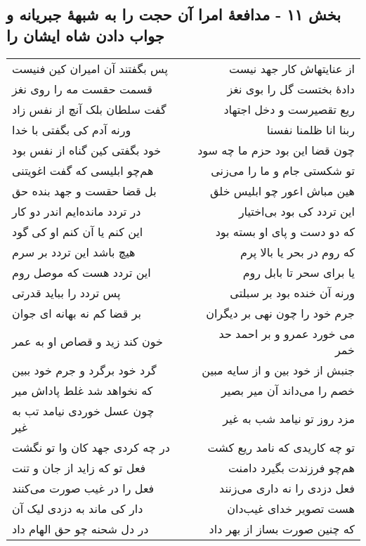 \begin{center}
\section*{بخش ۱۱ - مدافعهٔ امرا آن حجت را به شبههٔ جبریانه و جواب دادن شاه ایشان را}
\label{sec:sh011}
\begin{longtable}{l p{0.5cm} r}
پس بگفتند آن امیران کین فنیست
&&
از عنایتهاش کار جهد نیست
\\
قسمت حقست مه را روی نغز
&&
دادهٔ بختست گل را بوی نغز
\\
گفت سلطان بلک آنچ از نفس زاد
&&
ریع تقصیرست و دخل اجتهاد
\\
ورنه آدم کی بگفتی با خدا
&&
ربنا انا ظلمنا نفسنا
\\
خود بگفتی کین گناه از نفس بود
&&
چون قضا این بود حزم ما چه سود
\\
هم‌چو ابلیسی که گفت اغویتنی
&&
تو شکستی جام و ما را می‌زنی
\\
بل قضا حقست و جهد بنده حق
&&
هین مباش اعور چو ابلیس خلق
\\
در تردد مانده‌ایم اندر دو کار
&&
این تردد کی بود بی‌اختیار
\\
این کنم یا آن کنم او کی گود
&&
که دو دست و پای او بسته بود
\\
هیچ باشد این تردد بر سرم
&&
که روم در بحر یا بالا پرم
\\
این تردد هست که موصل روم
&&
یا برای سحر تا بابل روم
\\
پس تردد را بباید قدرتی
&&
ورنه آن خنده بود بر سبلتی
\\
بر قضا کم نه بهانه ای جوان
&&
جرم خود را چون نهی بر دیگران
\\
خون کند زید و قصاص او به عمر
&&
می خورد عمرو و بر احمد حد خمر
\\
گرد خود برگرد و جرم خود ببین
&&
جنبش از خود بین و از سایه مبین
\\
که نخواهد شد غلط پاداش میر
&&
خصم را می‌داند آن میر بصیر
\\
چون عسل خوردی نیامد تب به غیر
&&
مزد روز تو نیامد شب به غیر
\\
در چه کردی جهد کان وا تو نگشت
&&
تو چه کاریدی که نامد ریع کشت
\\
فعل تو که زاید از جان و تنت
&&
هم‌چو فرزندت بگیرد دامنت
\\
فعل را در غیب صورت می‌کنند
&&
فعل دزدی را نه داری می‌زنند
\\
دار کی ماند به دزدی لیک آن
&&
هست تصویر خدای غیب‌دان
\\
در دل شحنه چو حق الهام داد
&&
که چنین صورت بساز از بهر داد

\end{longtable}
\end{center}
